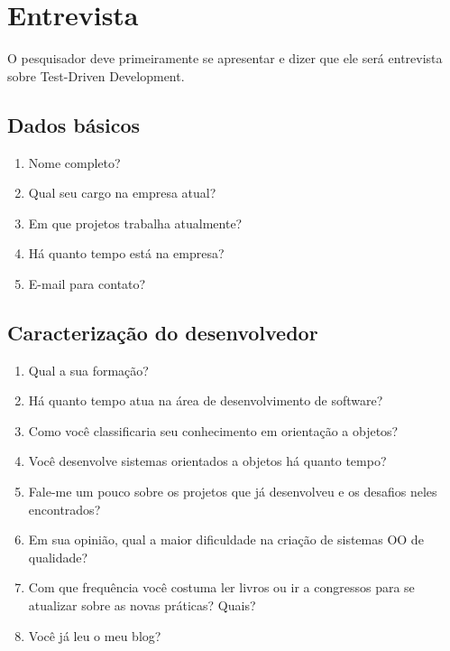 \chapter{Entrevista}
\label{ape:entrevista}

O pesquisador deve primeiramente se apresentar e dizer que ele será entrevista
sobre Test-Driven Development.

\section{Dados básicos}
\label{entrevista:dados-basicos}

\begin{enumerate}
	\item Nome completo?

	\item Qual seu cargo na empresa atual?
	
	\item Em que projetos trabalha atualmente?
	
	\item Há quanto tempo está na empresa?

	\item E-mail para contato?

\end{enumerate}

\section{Caracterização do desenvolvedor}
\label{entrevista:caracterizacao}

\begin{enumerate}
	\item Qual a sua formação?

	\item Há quanto tempo atua na área de desenvolvimento de software?

	\item Como você classificaria seu conhecimento em orientação a objetos?

	\item Você desenvolve sistemas orientados a objetos há quanto tempo?	

	\item Fale-me um pouco sobre os projetos que já desenvolveu e os desafios 
	neles encontrados?

	\item Em sua opinião, qual a maior dificuldade na criação de sistemas OO de
	qualidade?

	\item Com que frequência você costuma ler livros ou ir a congressos para se 
	atualizar sobre as novas práticas? Quais?
	
	\item Você já leu o meu blog?
\end{enumerate}


